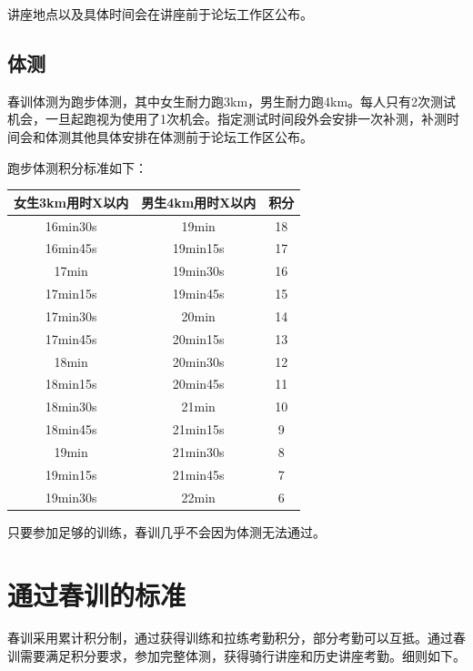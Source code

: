 \documentclass[UTF8]{ctexart}
\begin{document}
讲座地点以及具体时间会在讲座前于论坛工作区公布。

\subsection{体测}

春训体测为跑步体测，其中女生耐力跑3km，男生耐力跑4km。每人只有2次测试机会，一旦起跑视为使用了1次机会。指定测试时间段外会安排一次补测，补测时间会和体测其他具体安排在体测前于论坛工作区公布。

跑步体测积分标准如下：

\begin{table}[h]
    \centering
    \begin{tabular}{|c|c|c|}
    \hline
    女生3km用时X以内 & 男生4km用时X以内 & 积分 \\ \hline
    16min30s   & 19min      & 18 \\ \hline
    16min45s   & 19min15s   & 17 \\ \hline
    17min      & 19min30s   & 16 \\ \hline
    17min15s   & 19min45s   & 15 \\ \hline
    17min30s   & 20min      & 14 \\ \hline
    17min45s   & 20min15s   & 13 \\ \hline
    18min      & 20min30s   & 12 \\ \hline
    18min15s   & 20min45s   & 11 \\ \hline
    18min30s   & 21min      & 10 \\ \hline
    18min45s   & 21min15s   & 9  \\ \hline
    19min      & 21min30s   & 8  \\ \hline
    19min15s   & 21min45s   & 7  \\ \hline
    19min30s   & 22min      & 6  \\ \hline
    \end{tabular}\label{test}
    \end{table}

只要参加足够的训练，春训几乎不会因为体测无法通过。 

\section{通过春训的标准}

春训采用累计积分制，通过获得训练和拉练考勤积分，部分考勤可以互抵。通过春训需要满足积分要求，参加完整体测，获得骑行讲座和历史讲座考勤。细则如下。
\end{document}
